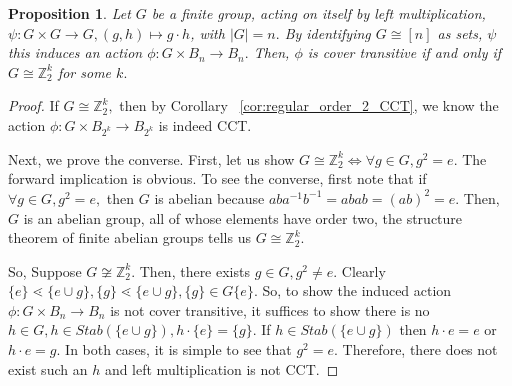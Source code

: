 \documentclass[10 pt]{amsart}
\theoremstyle{plain}
\newtheorem{prop}[thm]{Proposition}
\theoremstyle{definition}
\theoremstyle{remark}
\numberwithin{equation}{section}
\newcommand\BBZ{{\mathbb Z}}
\renewcommand{\iff}{\Leftrightarrow}
\begin{document}
\begin{prop}
\label{prop:regular_action_CCT}
Let $G$ be a finite group, acting on itself by left multiplication, $\psi:G\times G \rightarrow G,(g,h)\mapsto g\cdot h$, with $|G| = n.$ By identifying $G \cong [n]$ as sets, $\psi$ this induces an action $\phi:G\times B_n \rightarrow B_n.$ Then, $\phi$ is cover transitive if and only if $G \cong \BBZ_2^k$ for some $k.$
\end{prop}
\begin{proof}
If $G\cong \BBZ_2^k,$ then by Corollary ~\ref{cor:regular_order_2_CCT}, we know the action $\phi:G\times B_{2^k} \rightarrow B_{2^k}$ is indeed CCT.

Next, we prove the converse. First, let us show $G \cong \BBZ_2^k \iff \forall g \in G,g^2 = e.$ The forward implication is obvious. To see the converse, first note that if $\forall g \in G, g^2 = e,$ then $G$ is abelian because $aba^{-1}b^{-1} = abab = (ab)^2 = e.$ Then, $G$ is an abelian group, all of whose elements have order two, the structure theorem of finite abelian groups tells us $G \cong \BBZ_2^k.$

So, Suppose $G \not \cong \BBZ_2^k.$ Then, there exists $g \in G,g^2 \neq e.$ Clearly $\{e\}\lessdot \{e \cup g\},\{g\} \lessdot \{e \cup g\},\{g\} \in G\{e\}.$ So, to show the induced action $\phi: G \times B_n \rightarrow B_n$ is not cover transitive, it suffices to show there is no $h \in G,h \in Stab(\{e \cup g\}),h\cdot \{e\} =\{g\}.$  If $h \in Stab(\{e \cup g\})$ then $h \cdot e = e$ or $h \cdot e = g.$ In both cases, it is simple to see that $g^2 = e.$ Therefore, there does not exist such an $h$ and left multiplication is not CCT.
\end{proof}
\end{document}

